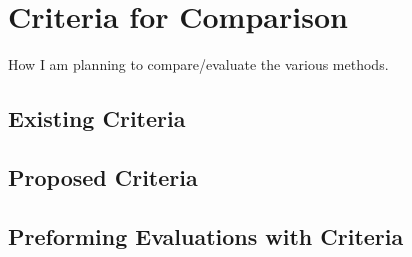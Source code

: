 \chapter{Criteria for Comparison}
How I am planning to compare/evaluate the various methods.


\section{ Existing Criteria }


\section{ Proposed Criteria }


\section{ Preforming Evaluations with Criteria }
